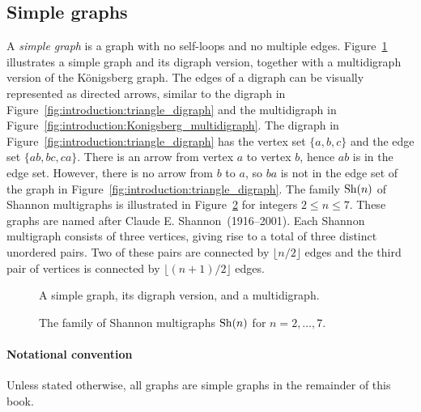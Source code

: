 
\subsection{Simple graphs}

A \emph{simple graph} is a
graph with no self-loops and no multiple edges.
Figure~\ref{fig:introduction:simple_graph_digraph_multidigraph}
illustrates a simple graph and its digraph version, together with a
multidigraph version of the K\"onigsberg graph. The edges of a digraph
can be visually represented as directed arrows, similar to the digraph
in Figure~\ref{fig:introduction:triangle_digraph} and the multidigraph
in Figure~\ref{fig:introduction:Konigsberg_multidigraph}. The digraph
in Figure~\ref{fig:introduction:triangle_digraph} has the vertex set
$\{a, b, c\}$ and the edge set $\{ab, bc, ca\}$. There is an arrow
from vertex $a$ to vertex $b$, hence $ab$ is in the edge set. However,
there is no arrow from $b$ to $a$, so $ba$ is not in the edge set of
the graph in Figure~\ref{fig:introduction:triangle_digraph}. The
family $\operatorname*{Sh}(n)$ of Shannon multigraphs is
illustrated in Figure~\ref{fig:introduction:Shannon_multigraphs} for
integers $2 \leq n \leq 7$. These graphs are named after
Claude E. Shannon~(1916--2001). Each Shannon
multigraph consists of three vertices, giving rise to a total of three
distinct unordered pairs. Two of these pairs are connected by
$\lfloor n/2 \rfloor$ edges and the third pair of vertices is
connected by $\lfloor (n + 1) / 2 \rfloor$ edges.

\begin{figure}[!htbp]
\centering

\caption{A simple graph, its digraph version, and a multidigraph.}
\label{fig:introduction:simple_graph_digraph_multidigraph}
\end{figure}

\begin{figure}[!htbp]
\centering
{}

\caption{The family of Shannon multigraphs $\operatorname*{Sh}(n)$ for $n = 2,\dots,7$.}
\label{fig:introduction:Shannon_multigraphs}
\end{figure}

\paragraph{Notational convention}
Unless stated otherwise, all graphs are simple graphs in the remainder
of this book.

